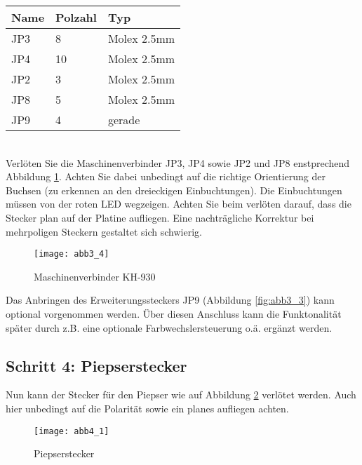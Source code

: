 \documentclass[fleqn,10pt]{SelfArx} %
\begin{document}
\begin{tabular}{lll}
\hline
\textbf{Name} & \textbf{Polzahl}  & \textbf{Typ} \\ \hline
JP3           & 8                 & Molex 2.5mm  \\ \hline
JP4           & 10                & Molex 2.5mm  \\ \hline
JP2           & 3                 & Molex 2.5mm  \\ \hline
JP8           & 5                 & Molex 2.5mm  \\ \hline
JP9           & 4                 & gerade       \\ \hline
\end{tabular}\\

Verlöten Sie die Maschinenverbinder JP3, JP4 sowie JP2 und JP8 enstprechend Abbildung \ref{fig:abb3_4}. Achten Sie dabei unbedingt auf die richtige Orientierung der Buchsen (zu erkennen an den dreieckigen Einbuchtungen). Die Einbuchtungen müssen von der roten LED wegzeigen. Achten Sie beim verlöten darauf, dass die Stecker plan auf der Platine aufliegen. Eine nachträgliche Korrektur bei mehrpoligen Steckern gestaltet sich schwierig.

\begin{figure}[tbhp]\centering
\texttt{[image: abb3\_4]}
\caption{Maschinenverbinder KH-930}
\label{fig:abb3_4}
\end{figure}

Das Anbringen des Erweiterungssteckers JP9 (Abbildung \ref{fig:abb3_3}) kann optional vorgenommen werden. Über diesen Anschluss kann die Funktonalität später durch z.B. eine optionale Farbwechslersteuerung o.ä. ergänzt werden. \par

\FloatBarrier

 \subsection*{Schritt 4: Piepserstecker}

Nun kann der Stecker für den Piepser wie auf Abbildung \ref{fig:abb4_1} verlötet werden. Auch hier unbedingt auf die Polarität sowie ein planes aufliegen achten.

\begin{figure}[tbhp]\centering
\texttt{[image: abb4\_1]}
\caption{Piepserstecker}
\label{fig:abb4_1}
\end{figure}
\end{document}
